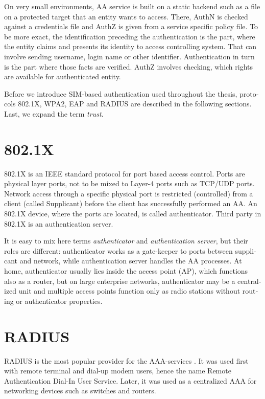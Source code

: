 \documentclass[12pt,a4paper,english]{tutthesis}
\begin{document}
\begin{otherlanguage}{english}
On very small environments, AA service is built on a static backend such
as a file on a protected target that an entity wants to access. There, AuthN
is checked against a credentials file and AuthZ is given from a service
specific policy file. 
To be more exact, the identification preceding the authentication is the part,
where the entity claims and presents its identity to 
access controlling system. That can involve sending username, login
name or other identifier. Authentication in turn is the part where
those facts are verified. AuthZ involves checking, which rights are 
available for authenticated entity. 


Before we introduce SIM-based authentication used throughout the
thesis, protocols 802.1X, WPA2, EAP and RADIUS are described in the
following sections. Last, we expand the term \emph{trust}.

\section{802.1X}
\label{sec-2-1}

802.1X \cite{8021X} is an IEEE standard protocol for port based access
control. Ports are physical layer ports, not to be mixed to Layer-4 ports such as TCP/UDP ports.
 Network access through a specific physical port is
restricted (controlled) from a client (called Supplicant) before
the client has successfully performed an AA. An 802.1X device, where
the ports are located, is called  authenticator. Third party in 802.1X is an
authentication server. 



It is easy to mix here terms \emph{authenticator} and \emph{authentication
server}, but their roles are different: authenticator works as a
gate-keeper to ports between supplicant and network, while
authentication server handles the AA processes.
At home, authenticator usually lies inside the access point (AP),
which functions also as a router, but 
on large enterprise networks, authenticator may be a centralized unit 
and multiple access points function only as radio stations without
routing or authenticator properties.



\section{RADIUS}
\label{sec-2-2}
\label{sec:radius}
RADIUS is the most popular provider for the 
AAA-services \cite[p.75]{radius-popular}.  It was used first with remote terminal
and dial-up modem users, hence the name Remote Authentication Dial-In
User Service. Later, it was used as a centralized AAA for networking
devices such as switches and routers.  











\end{otherlanguage}
\end{document}
